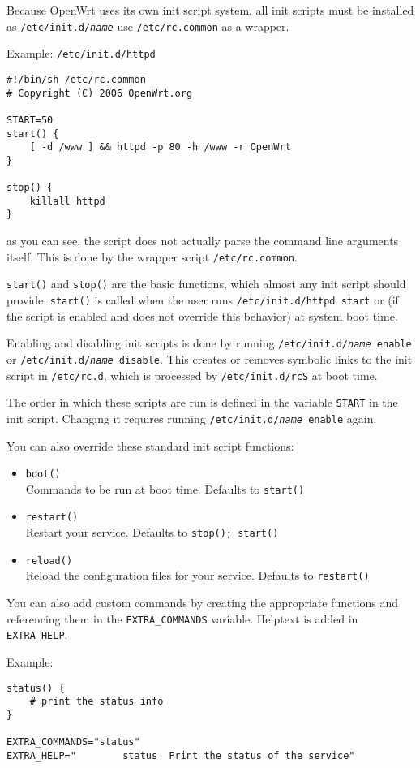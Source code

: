 Because OpenWrt uses its own init script system, all init scripts must be installed
as \texttt{/etc/init.d/\textit{name}} use \texttt{/etc/rc.common} as a wrapper.

Example: \texttt{/etc/init.d/httpd}

\begin{Verbatim}
#!/bin/sh /etc/rc.common
# Copyright (C) 2006 OpenWrt.org

START=50
start() {
    [ -d /www ] && httpd -p 80 -h /www -r OpenWrt
}

stop() {
    killall httpd
}
\end{Verbatim}

as you can see, the script does not actually parse the command line arguments itself.
This is done by the wrapper script \texttt{/etc/rc.common}.

\texttt{start()} and \texttt{stop()} are the basic functions, which almost any init
script should provide. \texttt{start()} is called when the user runs \texttt{/etc/init.d/httpd start}
or (if the script is enabled and does not override this behavior) at system boot time.

Enabling and disabling init scripts is done by running \texttt{/etc/init.d/\textit{name} enable}
or \texttt{/etc/init.d/\textit{name} disable}. This creates or removes symbolic links to the
init script in \texttt{/etc/rc.d}, which is processed by \texttt{/etc/init.d/rcS} at boot time.

The order in which these scripts are run is defined in the variable \texttt{START} in the init
script. Changing it requires running \texttt{/etc/init.d/\textit{name} enable} again.

You can also override these standard init script functions:
\begin{itemize}
    \item \texttt{boot()} \\
        Commands to be run at boot time. Defaults to \texttt{start()}

    \item \texttt{restart()} \\
        Restart your service. Defaults to \texttt{stop(); start()}

    \item \texttt{reload()} \\
        Reload the configuration files for your service. Defaults to \texttt{restart()}

\end{itemize}

You can also add custom commands by creating the appropriate functions and referencing them
in the \texttt{EXTRA\_COMMANDS} variable. Helptext is added in \texttt{EXTRA\_HELP}.

Example:

\begin{Verbatim}
status() {
    # print the status info
}

EXTRA_COMMANDS="status"
EXTRA_HELP="        status  Print the status of the service"
\end{Verbatim}

